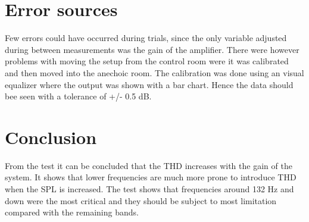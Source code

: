 \section{Error sources}
Few errors could have occurred during trials, since the only variable adjusted during between measurements was the gain of the amplifier. There were however problems with moving the setup from the control room were it was calibrated and then moved into the anechoic room. The calibration was done using an visual equalizer where the output was shown with a bar chart. Hence the data should bee seen with a tolerance of +/- 0.5 dB.

\section{Conclusion}

From the test it can be concluded that the THD increases with the gain of the system. It shows that lower frequencies are much more prone to introduce THD when the SPL is increased. The test shows that frequencies around 132 Hz and down were the most critical and they should be subject to most limitation compared with the remaining bands.

